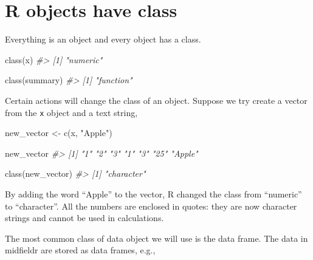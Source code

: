 \documentclass[
]{book}
\newenvironment{Shaded}{\begin{snugshade}}{\end{snugshade}}
\newcommand{\CommentTok}[1]{\textcolor[rgb]{0.56,0.35,0.01}{\textit{#1}}}
\newcommand{\FunctionTok}[1]{\textcolor[rgb]{0.00,0.00,0.00}{#1}}
\newcommand{\NormalTok}[1]{#1}
\newcommand{\OtherTok}[1]{\textcolor[rgb]{0.56,0.35,0.01}{#1}}
\newcommand{\StringTok}[1]{\textcolor[rgb]{0.31,0.60,0.02}{#1}}
\begin{document}
\hypertarget{r-objects-have-class}{%
\section{R objects have class}\label{r-objects-have-class}}

Everything is an object and every object has a class.

\begin{Shaded}
\begin{Highlighting}[]
\FunctionTok{class}\NormalTok{(x)}
\CommentTok{\#\textgreater{} [1] "numeric"}

\FunctionTok{class}\NormalTok{(summary)}
\CommentTok{\#\textgreater{} [1] "function"}
\end{Highlighting}
\end{Shaded}

Certain actions will change the class of an object. Suppose we try create a vector from the \texttt{x} object and a text string,

\begin{Shaded}
\begin{Highlighting}[]
\NormalTok{new\_vector }\OtherTok{\textless{}{-}} \FunctionTok{c}\NormalTok{(x, }\StringTok{"Apple"}\NormalTok{)}

\NormalTok{new\_vector}
\CommentTok{\#\textgreater{} [1] "1"     "2"     "3"     "1"     "3"     "25"    "Apple"}

\FunctionTok{class}\NormalTok{(new\_vector)}
\CommentTok{\#\textgreater{} [1] "character"}
\end{Highlighting}
\end{Shaded}

By adding the word ``Apple'' to the vector, R changed the class from ``numeric'' to ``character''. All the numbers are enclosed in quotes: they are now character strings and cannot be used in calculations.

The most common class of data object we will use is the data frame. The data in midfieldr are stored as data frames, e.g.,
\end{document}
